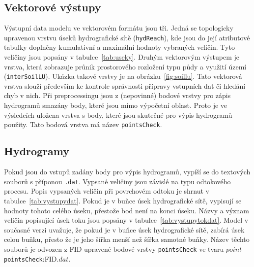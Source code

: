 \subsection{Vektorové výstupy}\label{sec:vektor}

Výstupní data modelu ve vektorovém formátu jsou tři. Jedná se topologicky upravenou vrstvu úseků hydrografické sítě ({\tt hydReach}), kde jsou do její atributové tabulky doplněny kumulativní a maximální hodnoty vybraných veličin. Tyto veličiny jsou popsány v tabulce~\ref{tab:useky}. Druhým vektorovým výstupem je vrstva, která zobrazuje průnik prostorového rozložení typu půdy a využití území ({\tt interSoilLU}). Ukázka takové vrstvy je na obrázku~\ref{fig:soillu}. Tato vektorová vrstva slouží především ke kontrole správnosti přípravy vstupních dat či hledání chyb v nich. Při preprocessingu jsou  z (nepovinné) bodové vrstvy pro zápis hydrogramů smazány body, které jsou mimo výpočetní oblast. Proto je ve výsledcích uložena vrstva s body, které jsou skutečné pro výpis hydrogramů použity. Tato bodová vrstva má název {\tt pointsCheck}. 













\subsection{Hydrogramy}\label{sec:hydrogramy}

Pokud jsou do vstupů zadány body pro výpis hydrogramů, vypíší se do textových souborů s příponou {\tt.dat}. Vypsané veličiny jsou závislé na typu odtokového procesu. Popis vypsaných veličin při povrchovém odtoku je shrnut v tabulce~\ref{tab:vystupydat}. Pokud je v buňce úsek hydrografické sítě, vypisují se hodnoty tohoto celého úseku, přestože bod není na konci úseku.  Názvy a význam veličin popisující úsek toku jsou popsány v tabulce~\ref{tab:vystupytokdat}.  Model v současné verzi uvažuje, že pokud je v buňce úsek hydrografické sítě, zabírá úsek celou buňku, přesto že je jeho šířka menší než šířka samotné buňky.  Název těchto souborů je odvozen z FID upravené bodové vrstvy {\tt pointsCheck} ve tvaru $point${{\tt pointsCheck}:FID}$.dat$. 









